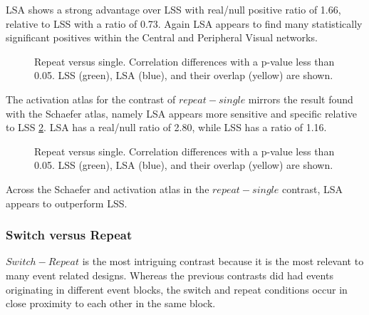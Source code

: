 \documentclass[10pt,letterpaper]{article}
\begin{document}
LSA shows a strong advantage over LSS with real/null positive ratio of 1.66,
relative to LSS with a ratio of 0.73.
Again LSA appears to find many statistically significant positives within the
Central and Peripheral Visual networks. 

\begin{figure}[H]
  \centering
  \caption{
    Repeat versus single. Correlation differences with a p-value less than 0.05.
    LSS (green), LSA (blue), and their overlap (yellow) are shown.
  }
  \label{fig:sch_repeatvsingle}
\end{figure}

The activation atlas for the contrast of $repeat - single$
mirrors the result found with the Schaefer atlas, namely LSA appears
more sensitive and specific relative to LSS \ref{fig:act_repeatvsingle}.
LSA has a real/null ratio of 2.80, while LSS has a ratio of 1.16.

\begin{figure}[H]
  \centering
  \qquad
  \caption{
    Repeat versus single. Correlation differences with a p-value less than 0.05.
    LSS (green), LSA (blue), and their overlap (yellow) are shown.
  }
  \label{fig:act_repeatvsingle}
\end{figure}

Across the Schaefer and activation atlas in the $repeat - single$ contrast,
LSA appears to outperform LSS.

\subsubsection*{Switch versus Repeat}
\label{results:bsc-switchXrepeat}

$Switch - Repeat$ is the most intriguing contrast because it is the most relevant
to many event related designs.
Whereas the previous contrasts did had events originating in different event blocks,
the switch and repeat conditions occur in close proximity to each other in the same block.
\end{document}
